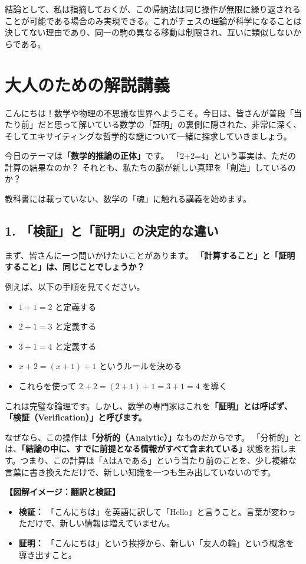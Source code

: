 \documentclass[a4paper,11pt,openany]{ltjsbook}
\begin{document}
結論として、私は指摘しておくが、この帰納法は同じ操作が無限に繰り返されることが可能である場合のみ実現できる。これがチェスの理論が科学になることは決してない理由であり、同一の駒の異なる移動は制限され、互いに類似しないからである。

\section{大人のための解説講義}
\begin{lecturebox}
こんにちは！数学や物理の不思議な世界へようこそ。今日は、皆さんが普段「当たり前」だと思って解いている数学の「証明」の裏側に隠された、非常に深く、そしてエキサイティングな哲学的な謎について一緒に探求していきましょう。

今日のテーマは\textbf{「数学的推論の正体」}です。
「2+2=4」という事実は、ただの計算の結果なのか？ それとも、私たちの脳が新しい真理を「創造」しているのか？

教科書には載っていない、数学の「魂」に触れる講義を始めます。

\subsection*{1. 「検証」と「証明」の決定的な違い}

まず、皆さんに一つ問いかけたいことがあります。
\textbf{「計算すること」と「証明すること」は、同じことでしょうか？}

例えば、以下の手順を見てください。
\begin{itemize}[leftmargin=2em]
\item $1+1=2$ と定義する
\item $2+1=3$ と定義する
\item $3+1=4$ と定義する
\item $x+2 = (x+1)+1$ というルールを決める
\item これらを使って $2+2 = (2+1)+1 = 3+1 = 4$ を導く
\end{itemize}

これは完璧な論理です。しかし、数学の専門家はこれを\textbf{「証明」とは呼ばず、「検証（Verification）」と呼びます。}

なぜなら、この操作は\textbf{「分析的（Analytic）」}なものだからです。
「分析的」とは、\textbf{「結論の中に、すでに前提となる情報がすべて含まれている」}状態を指します。つまり、この計算は「AはAである」という当たり前のことを、少し複雑な言葉に書き換えただけで、新しい知識を一つも生み出していないのです。

\textbf{【図解イメージ：翻訳と検証】}
\begin{itemize}[leftmargin=2em]
\item \textbf{検証：} 「こんにちは」を英語に訳して「Hello」と言うこと。言葉が変わっただけで、新しい情報は増えていません。
\item \textbf{証明：} 「こんにちは」という挨拶から、新しい「友人の輪」という概念を導き出すこと。
\end{itemize}


\end{lecturebox}
\end{document}
